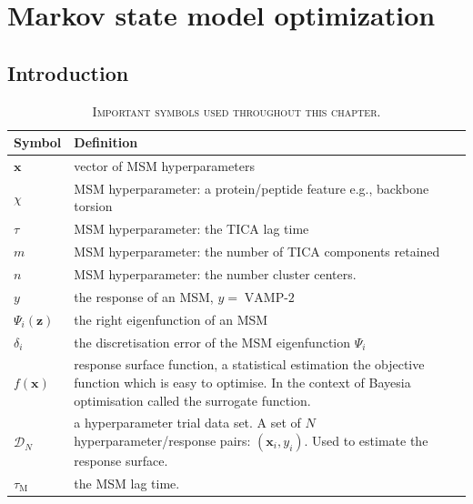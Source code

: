 \let\textcircled=\pgftextcircled
\chapter{Markov state model optimization}\label{chap:msm}

\section{Introduction}

\begin{table}
    \centering
    \caption[Important symbols]{\textsc{Important symbols used throughout this chapter}.}
    \begin{tabularx}{0.9\textwidth}{ l >{\raggedright\arraybackslash}X  } 
    \hline
        \textbf{Symbol}  &  \textbf{Definition} \\
        \hline\hline
        $\mathbf{x}$ & vector of MSM hyperparameters \\
        $\chi$ & MSM hyperparameter: a protein/peptide feature e.g., backbone torsion \\
        $\tau$ & MSM hyperparameter: the TICA lag time \\
        $m$ & MSM hyperparameter: the number of TICA components retained \\
        $n$ & MSM hyperparameter: the number cluster centers. \\
        $y$ & the response of an MSM, $y =\operatorname{VAMP-2}$ \\
        $\Psi_i(\mathbf{z})$ & the right eigenfunction of an MSM \\
        $\delta_i$ & the discretisation error of the MSM eigenfunction $\Psi_{i}$ \\
        $f(\mathbf{x})$ & response surface function, a statistical estimation the objective function 
                          which is easy to optimise. In the context of Bayesia optimisation called the 
                          surrogate function. \\
        $\mathcal{D}_{N}$ & a hyperparameter trial data set. A set of $N$ hyperparameter/response pairs: $(\mathbf{x}_{i}, y_{i})$. Used to estimate the response surface. \\
        $\tau_{\mathrm{M}}$ & the MSM lag time.  \\

\end{tabularx}
\end{table}
